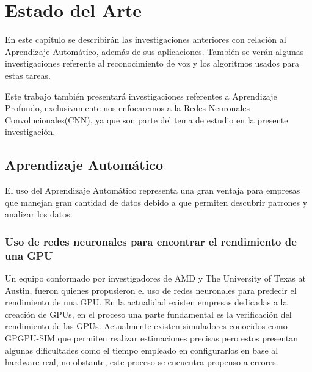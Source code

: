 \chapter{Estado del Arte}
En este capítulo se describirán las investigaciones anteriores con relación al Aprendizaje Automático, además de sus aplicaciones. También se verán algunas investigaciones referente al reconocimiento de voz y los algoritmos usados para estas tareas.

Este trabajo también presentará investigaciones referentes a Aprendizaje Profundo, exclusivamente nos enfocaremos a la Redes Neuronales Convolucionales(CNN), ya que son parte del tema de estudio en la presente investigación.




\section{Aprendizaje Automático}
El uso del Aprendizaje Automático representa una gran ventaja para empresas que manejan gran cantidad de datos debido a que permiten descubrir patrones y analizar los datos.

\subsection{Uso de redes neuronales para encontrar el rendimiento de una GPU}
Un equipo conformado por investigadores \cite{GPU}de AMD y The University of Texas at Austin, fueron quienes propusieron el uso de redes neuronales para predecir el rendimiento de una GPU.
En la actualidad existen empresas dedicadas a la creación de GPUs, en el proceso una parte fundamental es la verificación del rendimiento de las GPUs. Actualmente existen simuladores conocidos como GPGPU-SIM que permiten realizar estimaciones precisas pero estos presentan algunas dificultades como el tiempo empleado en configurarlos en base al hardware real, no obstante, este proceso se encuentra propenso a errores. 
